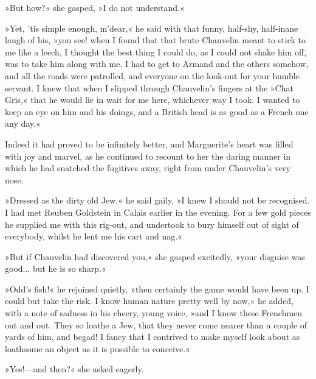 »But how?« she gasped, »I do not understand.«

»Yet, 'tis simple enough, m'dear,« he said with that funny, half-shy, half-inane laugh of his, »you see! when I found that that brute Chauvelin meant to stick to me like a leech, I thought the best thing I could do, as I could not shake him off, was to take him along with me. I had to get to Armand and the others somehow, and all the roads were patrolled, and everyone on the look-out for your humble servant. I knew that when I slipped through Chauvelin's fingers at the »Chat Gris,« that he would lie in wait for me here, whichever way I took. I wanted to keep an eye on him and his doings, and a British head is as good as a French one any day.«

Indeed it had proved to be infinitely better, and Marguerite's heart was filled with joy and marvel, as he continued to recount to her the daring manner in which he had snatched the fugitives away, right from under Chauvelin's very nose.

»Dressed as the dirty old Jew,« he said gaily, »I knew I should not be recognised. I had met Reuben Goldstein in Calais earlier in the evening. For a few gold pieces he supplied me with this rig-out, and undertook to bury himself out of sight of everybody, whilst he lent me his cart and nag.«

»But if Chauvelin had discovered you,« she gasped excitedly, »your disguise was good... but he is so sharp.«

»Odd's fish!« he rejoined quietly, »then certainly the game would have been up. I could but take the risk. I know human nature pretty well by now,« he added, with a note of sadness in his cheery, young voice, »and I know these Frenchmen out and out. They so loathe a Jew, that they never come nearer than a couple of yards of him, and begad! I fancy that I contrived to make myself look about as loathsome an object as it is possible to conceive.«

»Yes!\allowbreak---\allowbreak and then?« she asked eagerly.

